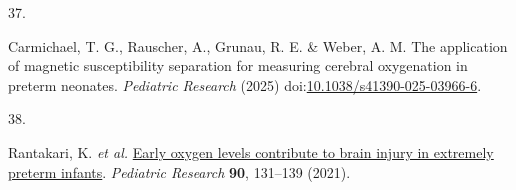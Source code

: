 \documentclass[
  letterpaper,
  DIV=11,
  numbers=noendperiod]{scrartcl}
\newlength{\cslhangindent}
\newlength{\csllabelwidth}
\newenvironment{CSLReferences}[2] %
 {\begin{list}{}{%
  \setlength{\itemindent}{0pt}
  \setlength{\leftmargin}{0pt}
  \setlength{\parsep}{0pt}
  \ifodd #1
   \setlength{\leftmargin}{\cslhangindent}
   \setlength{\itemindent}{-1\cslhangindent}
  \fi
  \setlength{\itemsep}{#2\baselineskip}}}
 {\end{list}}
\newcommand{\CSLLeftMargin}[1]{\parbox[t]{\csllabelwidth}{\strut#1\strut}}
\newcommand{\CSLRightInline}[1]{\parbox[t]{\linewidth - \csllabelwidth}{\strut#1\strut}}
\begin{document}
\begin{CSLReferences}{0}{0}
\CSLLeftMargin{37. }%
\CSLRightInline{Carmichael, T. G., Rauscher, A., Grunau, R. E. \& Weber,
A. M. The application of magnetic susceptibility separation for
measuring cerebral oxygenation in preterm neonates. \emph{Pediatric
Research} (2025)
doi:\href{https://doi.org/10.1038/s41390-025-03966-6}{10.1038/s41390-025-03966-6}.}

\CSLLeftMargin{38. }%
\CSLRightInline{Rantakari, K. \emph{et al.}
\href{https://doi.org/10.1038/s41390-021-01460-3}{Early oxygen levels
contribute to brain injury in extremely preterm infants}.
\emph{Pediatric Research} \textbf{90}, 131--139 (2021).}

\end{CSLReferences}
\end{document}
